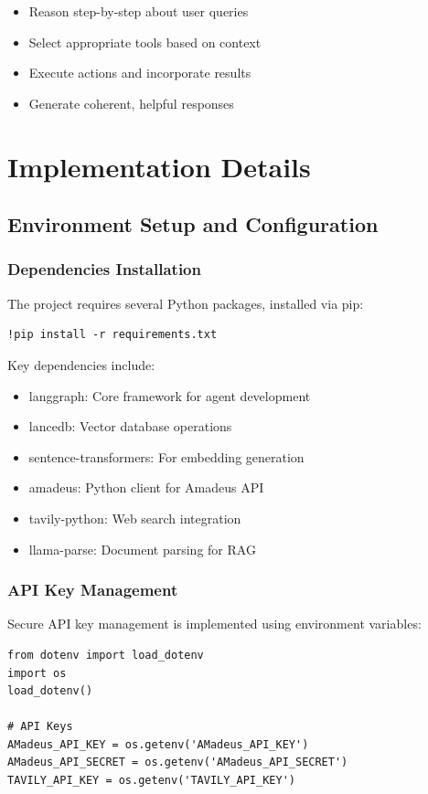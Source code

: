 \documentclass[12pt,a4paper]{article}
\begin{document}
\begin{itemize}
\item Reason step-by-step about user queries
\item Select appropriate tools based on context
\item Execute actions and incorporate results
\item Generate coherent, helpful responses
\end{itemize}

\section{Implementation Details}

\subsection{Environment Setup and Configuration}

\subsubsection{Dependencies Installation}
The project requires several Python packages, installed via pip:

\begin{lstlisting}
!pip install -r requirements.txt
\end{lstlisting}

Key dependencies include:
\begin{itemize}
\item langgraph: Core framework for agent development
\item lancedb: Vector database operations
\item sentence-transformers: For embedding generation
\item amadeus: Python client for Amadeus API
\item tavily-python: Web search integration
\item llama-parse: Document parsing for RAG
\end{itemize}

\subsubsection{API Key Management}
Secure API key management is implemented using environment variables:

\begin{lstlisting}
from dotenv import load_dotenv
import os
load_dotenv()

# API Keys
AMadeus_API_KEY = os.getenv('AMadeus_API_KEY')
AMadeus_API_SECRET = os.getenv('AMadeus_API_SECRET')
TAVILY_API_KEY = os.getenv('TAVILY_API_KEY')
\end{lstlisting}
\end{document}
